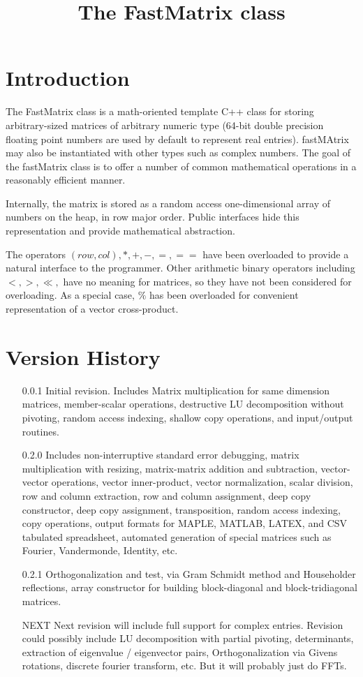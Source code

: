 \documentclass[10pt,fullpage]{article}
\title{The FastMatrix class}
\begin{document}
\maketitle

\section{Introduction}
The FastMatrix class is a math-oriented template C++ class for
storing arbitrary-sized matrices of arbitrary numeric type (64-bit
double precision floating point numbers are used by default to
represent real entries). fastMAtrix may also be instantiated with
other types such as complex numbers. The goal of the fastMatrix
class is to offer a number of common mathematical operations in a
reasonably efficient manner.

Internally, the matrix is stored as a random access one-dimensional
array of numbers on the heap, in row major order. Public interfaces
hide this representation and provide mathematical abstraction.

The operators $(row,col), *, +, -, =, ==$ have been overloaded to
provide a natural interface to the programmer. Other arithmetic
binary operators including  $<,
>, \ll, $ have no meaning for matrices, so they have not been
considered for overloading. As a special case, $\%$ has been
overloaded for convenient representation of a vector cross-product.

\newpage

\section{Version History}

\begin{itemize}
\item[0.0.1] Initial revision. Includes Matrix multiplication for same dimension matrices,
member-scalar operations, destructive LU decomposition without
pivoting, random access indexing, shallow copy operations, and
input/output routines.
\item[0.2.0] Includes non-interruptive standard error debugging, matrix multiplication with resizing,
matrix-matrix addition and subtraction, vector-vector operations,
vector inner-product, vector normalization, scalar division, row and
column extraction, row and column assignment, deep copy constructor,
deep copy assignment, transposition, random access indexing, copy
operations, output formats for MAPLE, MATLAB, LATEX, and CSV
tabulated spreadsheet, automated generation of special matrices such
as Fourier, Vandermonde, Identity, etc.
\item[0.2.1] Orthogonalization and test, via Gram Schmidt method and
Householder reflections, array constructor for building
block-diagonal and block-tridiagonal matrices.
\item[NEXT] Next revision will include full support for complex entries.
Revision could possibly include LU decomposition with partial
pivoting, determinants, extraction of eigenvalue / eigenvector
pairs, Orthogonalization via Givens rotations, discrete fourier
transform, etc. But it will probably just do FFTs.
\end{itemize}
\end{document}
